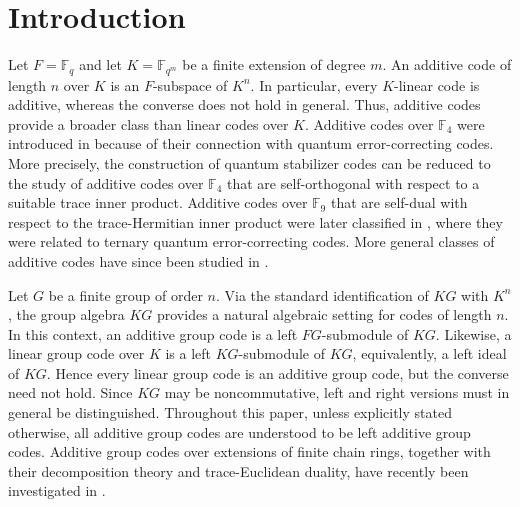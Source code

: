 \documentclass[11pt]{article}
\begin{document}
\section{Introduction}

Let $F=\mathbb{F}_q$ and let $K=\mathbb{F}_{q^m}$ be a finite extension of
degree $m$. An additive code of length $n$ over $K$ is an $F$-subspace of
$K^n$. In particular, every $K$-linear code is additive, whereas the converse
does not hold in general. Thus, additive codes provide a broader class than
linear codes over $K$. Additive codes over $\mathbb{F}_4$ were introduced in
\cite{Calderbank} because of their connection with quantum error-correcting
codes. More precisely, the construction of quantum stabilizer codes can be
reduced to the study of additive codes over $\mathbb{F}_4$ that are
self-orthogonal with respect to a suitable trace inner product. Additive codes
over $\mathbb{F}_9$ that are self-dual with respect to the trace-Hermitian
inner product were later classified in \cite{Danielsen}, where they were
related to ternary quantum error-correcting codes. More general classes of
additive codes have since been studied in
\cite{Bierbrauer-7, Huffman-2010, Huffman-2013}.

Let $G$ be a finite group of order $n$. Via the standard identification of
$KG$ with $K^n$, the group algebra $KG$ provides a natural algebraic setting
for codes of length $n$. In this context, an additive group code is a left
$FG$-submodule of $KG$. Likewise, a linear group code over $K$ is a left
$KG$-submodule of $KG$, equivalently, a left ideal of $KG$. Hence every
linear group code is an additive group code, but the converse need not hold.
Since $KG$ may be noncommutative, left and right versions must in general be
distinguished. Throughout this paper, unless explicitly stated otherwise, all
additive group codes are understood to be left additive group codes.
Additive group codes over extensions of finite chain rings, together with
their decomposition theory and trace-Euclidean duality, have recently been
investigated in \cite{BCFM-2025}.
\end{document}
